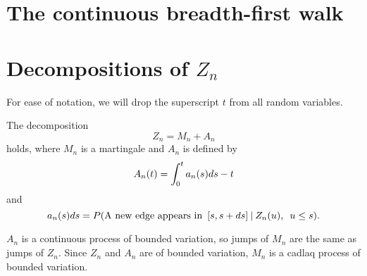 \section{The continuous breadth-first walk}



\section{Decompositions of $Z_n$}

For ease of notation, we will drop the superscript $t$ from all random variables.


\begin{lemma} \label{L: decomp Zn}
	The decomposition 
	\begin{equation} \label{E: decomp Zn}
	Z_n = M_n + A_n
	\end{equation}
	holds, where $M_n$ is a martingale and $A_n$ is defined by
	\begin{equation} \label{D: An}
	A_n(t) = \int_{0}^{t} a_n(s)ds - t
	\end{equation}
	and
	\begin{equation} \label{D: an}
	a_n(s)ds = P(\text{A new edge appears in} \enspace [s, s+ds] \: | \: Z_n(u), \enspace u \leq s).
	\end{equation}	
\end{lemma}
\begin{note} \label{N: decomp Zn}
	$A_n$ is a continuous process of bounded variation, so jumps of $M_n$ are the same as jumps of $Z_n$. Since $Z_n$ and $A_n$ are of bounded variation, $M_n$ is a cadlaq process of bounded variation.
\end{note}


